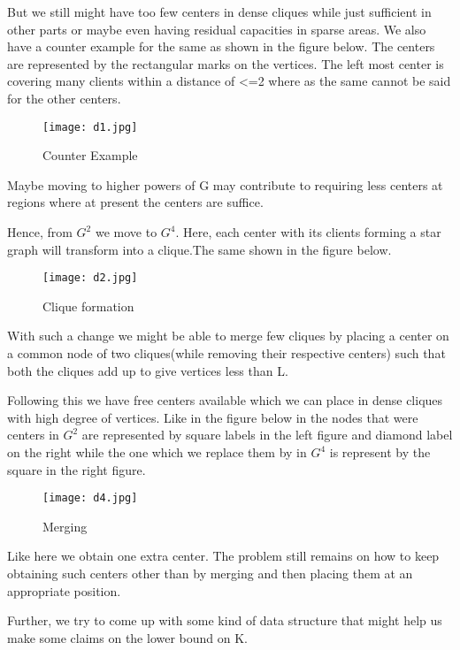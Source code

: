 \documentclass[12pt,a4paper,onecolumn]{article}
\begin{document}
\begin{itemize}
But we still might have too few centers in dense cliques while just sufficient in other parts or maybe even having residual capacities in sparse areas. We also have a counter example for the same as shown in the figure below. The centers are represented by the rectangular marks on the vertices. The left most center is covering many clients within a distance of <=2 where as the same cannot be said for the other centers.\\
\begin{figure}[H]
\begin{center}
\texttt{[image: d1.jpg]}
  \caption{Counter Example}
  \label{Figure 12}
\end{center}
\end{figure} Maybe moving to higher powers of G may contribute to requiring less centers at regions where at present the centers are suffice.

Hence, from $G^2$ we move to $G^4$. Here, each center with its clients forming a star graph will transform into a clique.The same shown in the figure below.\begin{figure}[H]
\begin{center}
\texttt{[image: d2.jpg]}
  \caption{Clique formation}
  \label{Figure 10}
\end{center}
\end{figure} With such a change we might be able to merge few cliques by placing a center on a common node of two cliques(while removing their respective centers) such that both the cliques add up to give vertices less than L. 

Following this we have free centers available which we can place in dense cliques with high degree of vertices. Like in the figure below in the nodes that were centers in $G^2$ are represented by square labels in the left figure and diamond label on the right while the one which we replace them by in $G^4$ is represent by the square in the right figure.
\begin{figure}[H]
\begin{center}
\texttt{[image: d4.jpg]}
  \caption{Merging}
  \label{Figure 11}
\end{center}
\end{figure}
Like here we obtain one extra center. The problem still remains on how to keep obtaining such centers other than by merging and then placing them at an appropriate position.

Further, we try to come up with some kind of data structure that might help us make some claims on the lower bound on K. \begin{figure}


\end{figure}
\end{itemize}
\end{document}

